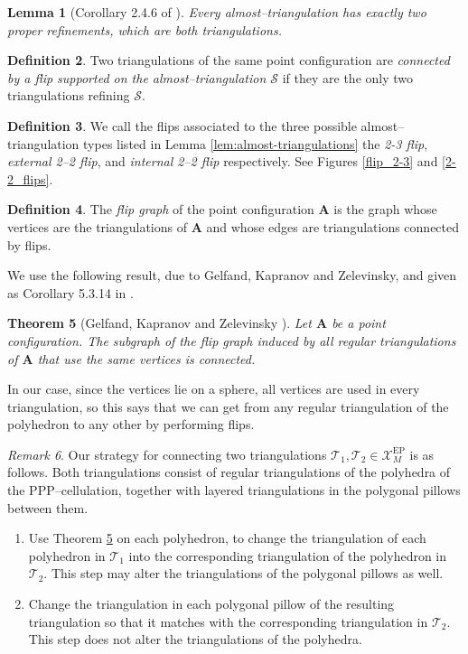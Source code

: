 \documentclass[12pt]{amsart}
\newtheorem{thm}{Theorem}[section]
\newtheorem{lemma}[thm]{Lemma}
\theoremstyle{definition}
\newtheorem{defn}[thm]{Definition}
\theoremstyle{remark}
\newtheorem{rmk}[thm]{Remark}
\def\tri{\mathcal{T}}
\def \bA{\mathbf{A}} %
\def\calX{\mathcal X}
\def\EP{\mathrm{EP}}
\begin{document}
\begin{lemma}[Corollary 2.4.6 of \cite{DeLoera:book}]
Every almost--triangulation has exactly two proper refinements, which are both triangulations.
\end{lemma}

\begin{defn}
Two triangulations of the same point configuration are \emph{connected by a flip supported on the almost--triangulation $\mathcal{S}$} if they are the only two triangulations refining $\mathcal{S}$.
\end{defn}

\begin{defn}
We call the flips associated to the three possible almost--triangulation types listed in Lemma \ref{lem:almost-triangulations} the \emph{2-3 flip}, \emph{external 2--2 flip}, and \emph{internal 2--2 flip} respectively. See Figures \ref{flip_2-3} and \ref{2-2_flips}.
\end{defn}



\begin{defn}
The \emph{flip graph} of the point configuration $\bA$ is the graph whose vertices are the triangulations of $\bA$ and whose edges are triangulations connected by flips.
\end{defn}

We use the following result, due to Gelfand, Kapranov and Zelevinsky, and given as Corollary 5.3.14 in \cite{DeLoera:book}.

\begin{thm}[Gelfand, Kapranov and Zelevinsky \cite{GKZ}]\label{GKZ}
Let $\bA$ be a point configuration. The subgraph of the flip graph induced by all regular triangulations of $\bA$ that use the same vertices is connected.
\end{thm}

In our case, since the vertices lie on a sphere, all vertices are used in every triangulation, so this says that we can get from any regular triangulation  of the polyhedron to any other by performing flips.\\

\begin{rmk}\label{retriangulate strategy}
Our strategy for connecting two triangulations $\tri_1, \tri_2\in\calX_M^{\EP}$ is as follows. Both triangulations consist of regular triangulations of the polyhedra of the PPP--cellulation, together with layered triangulations in the polygonal pillows between them.
\begin{enumerate}
\item Use Theorem \ref{GKZ} on each polyhedron, to change the triangulation of each polyhedron in $\tri_1$ into the corresponding triangulation of  the polyhedron in $\tri_2$. This step may alter the triangulations of the polygonal pillows as well. \label{retriangulate step 1}
\item Change the triangulation in each polygonal pillow of the resulting triangulation so that it matches with the corresponding triangulation in $\tri_2$. This step does not alter the triangulations of the polyhedra. \label{retriangulate step 2}
\end{enumerate}
\end{rmk}
\end{document}

